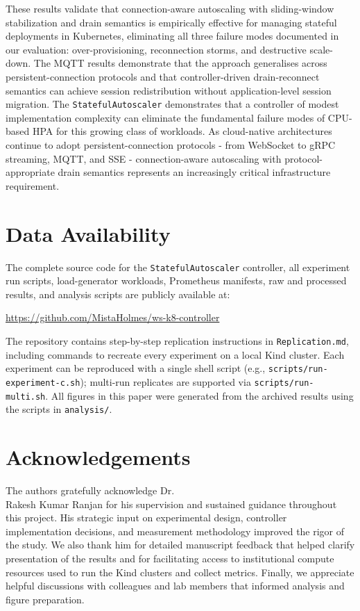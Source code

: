 \documentclass[twocolumn]{svjour3}
\begin{document}
These results validate that connection-aware autoscaling with sliding-window stabilization and drain semantics is empirically effective for managing stateful deployments in Kubernetes, eliminating all three failure modes documented in our evaluation: over-provisioning, reconnection storms, and destructive scale-down. The MQTT results demonstrate that the approach generalises across persistent-connection protocols and that controller-driven drain-reconnect semantics can achieve session redistribution without application-level session migration. The \texttt{StatefulAutoscaler} demonstrates that a controller of modest implementation complexity can eliminate the fundamental failure modes of CPU-based HPA for this growing class of workloads. As cloud-native architectures continue to adopt persistent-connection protocols - from WebSocket to gRPC streaming, MQTT, and SSE - connection-aware autoscaling with protocol-appropriate drain semantics represents an increasingly critical infrastructure requirement.


\section*{Data Availability}

The complete source code for the \texttt{StatefulAutoscaler} controller, all experiment run scripts, load-generator workloads, Prometheus manifests, raw and processed results, and analysis scripts are publicly available at:

\begin{center}
\url{https://github.com/MistaHolmes/ws-k8-controller}
\end{center}

The repository contains step-by-step replication instructions in \texttt{Replication.md}, including commands to recreate every experiment on a local Kind cluster.  Each experiment can be reproduced with a single shell script (e.g., \texttt{scripts/run-experiment-c.sh}); multi-run replicates are supported via \texttt{scripts/run-multi.sh}.  All figures in this paper were generated from the archived results using the scripts in \texttt{analysis/}.

\section*{Acknowledgements}
The authors gratefully acknowledge Dr.\\ Rakesh Kumar Ranjan for his supervision and sustained guidance throughout this project. His strategic input on experimental design, controller implementation decisions, and measurement methodology improved the rigor of the study. We also thank him for detailed manuscript feedback that helped clarify presentation of the results and for facilitating access to institutional compute resources used to run the Kind clusters and collect metrics. Finally, we appreciate helpful discussions with colleagues and lab members that informed analysis and figure preparation.




\end{document}
